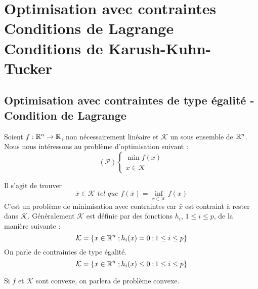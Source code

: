 		
\section{Optimisation avec contraintes \\ Conditions de Lagrange \\ Conditions de Karush-Kuhn-Tucker }

\subsection{Optimisation avec contraintes de type égalité - Condition de Lagrange}
Soient $f : \mathbb{R}^n \rightarrow \mathbb{R}$, non nécessairement linéaire et $\mathcal{K}$ un sous ensemble de $\mathbb{R}^n$.\\
Nous nous intéressons au problème d'optimisation suivant :
 \[ (\mathcal{P})\begin{cases}\min f(x) \\ x \in \mathcal{K} \end{cases} \]

Il s'agit de trouver \[ \bar{x}\in \mathcal{K} \textit{ tel que } f(\bar{x})=\inf_{x\in \mathcal{K}}f(x) \]
C'est un problème de minimisation avec contraintes car $\bar{x}$ est contraint à rester dans $\mathcal{K}$.
Généralement $\mathcal{K}$ est définie par des fonctions $h_i$, $1 \leq i \leq p$, de la manière suivante : \[ \mathcal{K}=\{x\in\mathbb{R}^n\; ;h_i(x)=0\; ;1\leq i\leq p\} \]
On parle de contraintes de type égalité.
\[ \mathcal{K}=\{x\in\mathbb{R}^n\; ;h_i(x)\leq 0\; ;1\leq i\leq p\} \]

Si $f$ et $\mathcal{K}$ sont convexe, on parlera de problème convexe.

